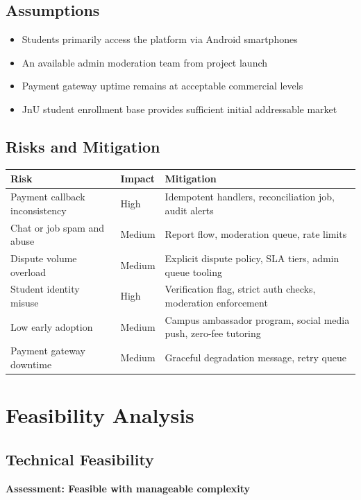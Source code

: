 \documentclass[a4paper,12pt]{article}
\begin{document}
\subsection{Assumptions}
\begin{itemize}
    \item Students primarily access the platform via Android smartphones
    \item An available admin moderation team from project launch
    \item Payment gateway uptime remains at acceptable commercial levels
    \item JnU student enrollment base provides sufficient initial addressable market
\end{itemize}

\subsection{Risks and Mitigation}

\begin{table}[H]
\centering
\small
\begin{tabular}{|l|l|p{5cm}|}
\hline
\textbf{Risk} & \textbf{Impact} & \textbf{Mitigation} \\
\hline
Payment callback inconsistency & High & Idempotent handlers, reconciliation job, audit alerts \\
Chat or job spam and abuse & Medium & Report flow, moderation queue, rate limits \\
Dispute volume overload & Medium & Explicit dispute policy, SLA tiers, admin queue tooling \\
Student identity misuse & High & Verification flag, strict auth checks, moderation enforcement \\
Low early adoption & Medium & Campus ambassador program, social media push, zero-fee tutoring \\
Payment gateway downtime & Medium & Graceful degradation message, retry queue \\
\hline
\end{tabular}
\end{table}

\section{Feasibility Analysis}

\subsection{Technical Feasibility}
\textbf{Assessment: Feasible with manageable complexity}
\end{document}
